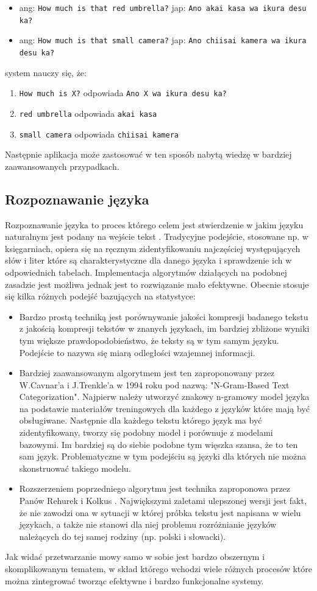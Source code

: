  \begin{itemize}
	\item ang: \verb"How much is that red umbrella?" jap: \verb"Ano akai kasa wa ikura desu ka?"
	\item ang: \verb"How much is that small camera?" jap: \verb"Ano chiisai kamera wa ikura desu ka?"
\end{itemize} 
system nauczy się, że:
 \begin{enumerate}
	\item \verb"How much is X?" odpowiada \verb"Ano X wa ikura desu ka?"
	\item \verb"red umbrella" odpowiada \verb"akai kasa"
	\item \verb"small camera" odpowiada \verb"chiisai kamera"
\end{enumerate} 
Następnie aplikacja może zastosować w ten sposób nabytą wiedzę w bardziej zaawansowanych przypadkach.
\subsection{Rozpoznawanie języka}
Rozpoznawanie języka to proces którego celem jest stwierdzenie w jakim języku naturalnym jest podany na wejście tekst \cite{adams1997} . Tradycyjne podejście, stosowane np. w księgarniach, opiera się na ręcznym zidentyfikowaniu najczęściej występujących słów i liter które są charakterystyczne dla danego języka i sprawdzenie ich w odpowiednich tabelach. Implementacja algorytmów działących na podobnej zasadzie jest możliwa jednak jest to rozwiązanie mało efektywne. Obecnie stosuje się kilka różnych podejść bazujących na statystyce:
 \begin{itemize}
	\item Bardzo prostą techniką jest porównywanie jakości kompresji badanego tekstu z jakością kompresji tekstów w znanych językach, im bardziej zbliżone wyniki tym większe prawdopodobieństwo, że teksty są w tym samym języku. Podejście to nazywa się miarą odległości wzajemnej informacji.
	\item Bardziej zaawansowanym algorytmem jest ten zaproponowany przez W.Cavnar'a i J.Trenkle'a w 1994 roku pod nazwą: "N-Gram-Based Text Categorization". Najpierw należy utworzyć znakowy n-gramowy model języka na podstawie materiałów treningowych dla każdego z języków które mają być obsługiwane. Następnie dla każdego tekstu którego język ma być zidentyfikowany, tworzy się podobny model i porównuje z modelami bazowymi. Im bardziej są do siebie podobne tym więszka szansa, że to ten sam język. Problematyczne w tym podejściu są języki dla których nie można skonstruować takiego modelu. 
	\item Rozszerzeniem poprzedniego algorytmu jest technika zaproponowa przez Panów Rehurek i Kolkus \cite{rehurek2009} . Największymi zaletami ulepszonej wersji jest fakt, że nie zawodzi ona w sytuacji w której próbka tekstu jest napisana w wielu językach, a także nie stanowi dla niej problemu rozróżnianie języków należących do tej samej rodziny (np. polski i słowacki). 
\end{itemize} 
Jak widać przetwarzanie mowy samo w sobie jest bardzo obszernym i skomplikowanym tematem, w skład którego wchodzi wiele różnych procesów które można zintegrować tworząc efektywne i bardzo funkcjonalne systemy.


